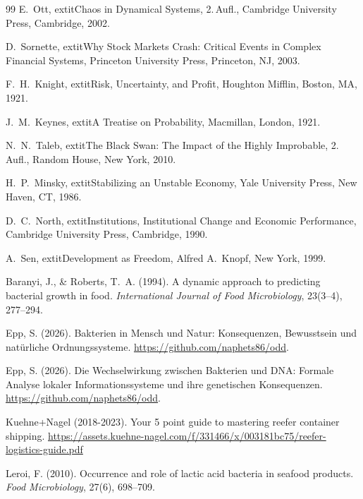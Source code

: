 \documentclass[a4paper, 12pt, twoside, openright]{report}
\theoremstyle{definition}
\theoremstyle{definition}
\begin{document}
\begin{thebibliography}{99}
E.~Ott,
	extit{Chaos in Dynamical Systems},
2.\,Aufl., Cambridge University Press, Cambridge, 2002.

D.~Sornette,
	extit{Why Stock Markets Crash: Critical Events in Complex Financial Systems},
Princeton University Press, Princeton, NJ, 2003.

F.~H.~Knight,
	extit{Risk, Uncertainty, and Profit},
Houghton Mifflin, Boston, MA, 1921.

J.~M.~Keynes,
	extit{A Treatise on Probability},
Macmillan, London, 1921.

N.~N.~Taleb,
	extit{The Black Swan: The Impact of the Highly Improbable},
2.\,Aufl., Random House, New York, 2010.

H.~P.~Minsky,
	extit{Stabilizing an Unstable Economy},
Yale University Press, New Haven, CT, 1986.

D.~C.~North,
	extit{Institutions, Institutional Change and Economic Performance},
Cambridge University Press, Cambridge, 1990.

A.~Sen,
	extit{Development as Freedom},
Alfred A.~Knopf, New York, 1999.

Baranyi, J., \& Roberts, T.~A. (1994).
\newblock A dynamic approach to predicting bacterial growth in food.
\newblock \emph{International Journal of Food Microbiology}, 23(3--4), 277--294.

Epp, S. (2026).
\newblock Bakterien in Mensch und Natur: Konsequenzen, Bewusstsein und natürliche Ordnungssysteme.
\newblock \url{https://github.com/naphets86/odd}.

Epp, S. (2026).
\newblock Die Wechselwirkung zwischen Bakterien und DNA: Formale Analyse lokaler
  Informationssysteme und ihre genetischen Konsequenzen.
\newblock \url{https://github.com/naphets86/odd}.

Kuehne+Nagel (2018-2023).
\newblock Your 5 point guide to mastering reefer container shipping.
\newblock \url{https://assets.kuehne-nagel.com/f/331466/x/003181bc75/reefer-logistics-guide.pdf}

Leroi, F. (2010).
\newblock Occurrence and role of lactic acid bacteria in seafood products.
\newblock \emph{Food Microbiology}, 27(6), 698--709.


\end{thebibliography}
\end{document}
